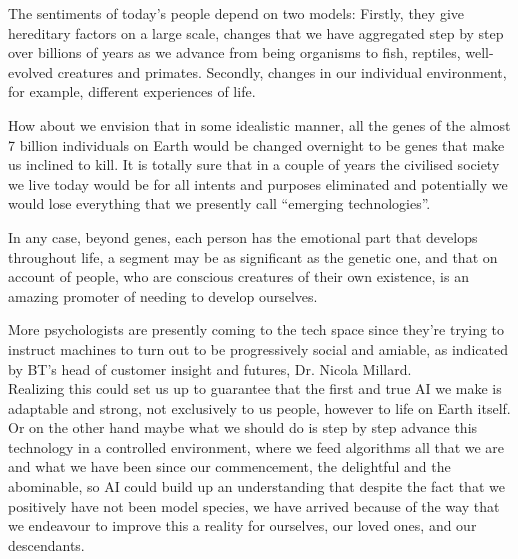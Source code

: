 \documentclass[12pt]{article}
\begin{document}
The sentiments of today’s people depend on two models: Firstly, they give hereditary factors on a large scale, changes that we have aggregated step by step over billions of years as we advance from being organisms to fish, reptiles, well-evolved creatures and primates. Secondly, changes in our individual environment, for example, different experiences of life.

How about we envision that in some idealistic manner, all the genes of the almost 7 billion individuals on Earth would be changed overnight to be genes that make us inclined to kill. It is totally sure that in a couple of years the civilised society we live today would be for all intents and purposes eliminated and potentially we would lose everything that we presently call “emerging technologies”.

In any case, beyond genes, each person has the emotional part that develops throughout life, a segment may be as significant as the genetic one, and that on account of people, who are conscious creatures of their own existence, is an amazing promoter of needing to develop ourselves.

More psychologists are presently coming to the tech space since they’re trying to instruct machines to turn out to be progressively social and amiable, as indicated by BT’s head of customer insight and futures, Dr. Nicola Millard.\\
Realizing this could set us up to guarantee that the first and true AI we make is adaptable and strong, not exclusively to us people, however to life on Earth itself. Or on the other hand maybe what we should do is step by step advance this technology in a controlled environment, where we feed algorithms all that we are and what we have been since our commencement, the delightful and the abominable, so AI could build up an understanding that despite the fact that we positively have not been model species, we have arrived because of the way that we endeavour to improve this a reality for ourselves, our loved ones, and our descendants.

 
\end{document}
